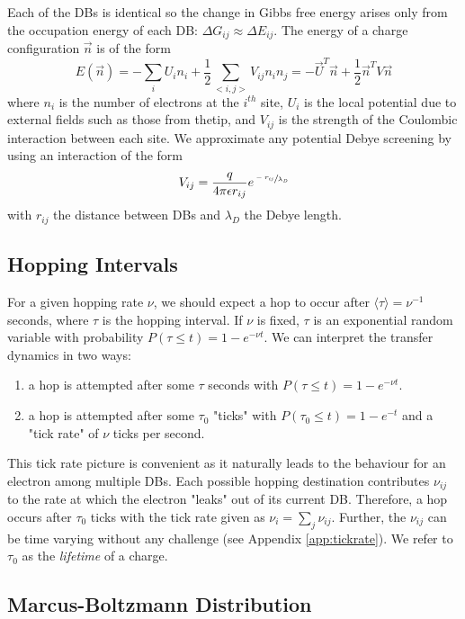 \documentclass[11pt]{article}
\newcommand{\expect}[1]{\langle #1 \rangle}
\begin{document}
Each of the DBs is identical so the change in Gibbs free energy arises only from the occupation energy of each DB: $\Delta G_{ij} \approx \Delta E_{ij}$. The energy of a charge configuration $\vec{n}$ is of the form
\begin{equation}
E(\vec{n}) = -\sum_i U_i n_i + \frac{1}{2} \sum_{<i,j>} V_{ij}n_in_j = -\vec{U}^T\vec{n} + \frac{1}{2}\vec{n}^T V \vec{n}
\end{equation}
where $n_i$ is the number of electrons at the $i^{th}$ site, $U_i$ is the local potential due to external fields such as those from thetip, and $V_{ij}$ is the strength of the Coulombic interaction between each site. We approximate any potential Debye screening by using an interaction of the form
\begin{equation}
V_{ij} = \frac{q}{4\pi\epsilon r_{ij}}e^{\sfrac{-r_{ij}}{\lambda_D}}
\end{equation}
with $r_{ij}$ the distance between DBs and $\lambda_D$ the Debye length.

\subsection{Hopping Intervals}

For a given hopping rate $\nu$, we should expect a hop to occur after $\expect{\tau} = \nu^{-1}$ seconds, where $\tau$ is the hopping interval. If $\nu$ is fixed, $\tau$ is an exponential random variable with probability $P(\tau \leq t) = 1-e^{-\nu t}$. We can interpret the transfer dynamics in two ways:
\begin{enumerate}
 \item a hop is attempted after some $\tau$ seconds with $P(\tau \leq t) = 1-e^{-\nu t}$.
 \item a hop is attempted after some $\tau_0$ "ticks" with $P(\tau_0 \leq t) = 1-e^{-t}$ and a "tick rate" of $\nu$ ticks per second.
\end{enumerate}
This tick rate picture is convenient as it naturally leads to the behaviour for an electron among multiple DBs. Each possible hopping destination contributes $\nu_{ij}$ to the rate at which the electron "leaks" out of its current DB. Therefore, a hop occurs after $\tau_0$ ticks with the tick rate given as $\nu_i = \sum_j \nu_{ij}$. Further, the $\nu_{ij}$ can be time varying without any challenge (see Appendix \ref{app:tickrate}). We refer to $\tau_0$ as the \emph{lifetime} of a charge.

\subsection{Marcus-Boltzmann Distribution}
\end{document}

